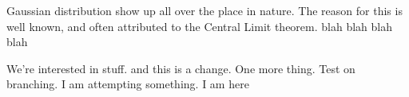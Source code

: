 Gaussian distribution show up all over the place in nature.
The reason for this is well known,
and often attributed to the Central Limit theorem. blah blah blah blah
\cite{clt} \cite{clt2}

We're interested in stuff. and this is a change. One more thing. Test on
branching. I am attempting something. I am here
